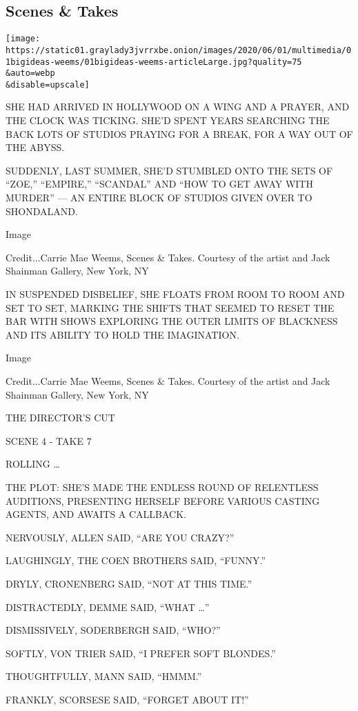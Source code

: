 \hypertarget{scenes--takes}{%
\subsection{Scenes \& Takes}\label{scenes--takes}}

\texttt{[image: https://static01.graylady3jvrrxbe.onion/images/2020/06/01/multimedia/01bigideas-weems/01bigideas-weems-articleLarge.jpg?quality=75\\\&auto=webp\\\&disable=upscale]}

SHE HAD ARRIVED IN HOLLYWOOD ON A WING AND A PRAYER, AND THE CLOCK WAS
TICKING. SHE'D SPENT YEARS SEARCHING THE BACK LOTS OF STUDIOS PRAYING
FOR A BREAK, FOR A WAY OUT OF THE ABYSS.

SUDDENLY, LAST SUMMER, SHE'D STUMBLED ONTO THE SETS OF ``ZOE,''
``EMPIRE,'' ``SCANDAL'' AND ``HOW TO GET AWAY WITH MURDER'' --- AN
ENTIRE BLOCK OF STUDIOS GIVEN OVER TO SHONDALAND.

Image

Credit...Carrie Mae Weems, Scenes \& Takes. Courtesy of the artist and
Jack Shainman Gallery, New York, NY

IN SUSPENDED DISBELIEF, SHE FLOATS FROM ROOM TO ROOM AND SET TO SET,
MARKING THE SHIFTS THAT SEEMED TO RESET THE BAR WITH SHOWS EXPLORING THE
OUTER LIMITS OF BLACKNESS AND ITS ABILITY TO HOLD THE IMAGINATION.

Image

Credit...Carrie Mae Weems, Scenes \& Takes. Courtesy of the artist and
Jack Shainman Gallery, New York, NY

THE DIRECTOR'S CUT

SCENE 4 - TAKE 7

ROLLING \ldots{}

THE PLOT: SHE'S MADE THE ENDLESS ROUND OF RELENTLESS AUDITIONS,
PRESENTING HERSELF BEFORE VARIOUS CASTING AGENTS, AND AWAITS A CALLBACK.

NERVOUSLY, ALLEN SAID, ``ARE YOU CRAZY?''

LAUGHINGLY, THE COEN BROTHERS SAID, ``FUNNY.''

DRYLY, CRONENBERG SAID, ``NOT AT THIS TIME.''

DISTRACTEDLY, DEMME SAID, ``WHAT \ldots{}''

DISMISSIVELY, SODERBERGH SAID, ``WHO?''

SOFTLY, VON TRIER SAID, ``I PREFER SOFT BLONDES.''

THOUGHTFULLY, MANN SAID, ``HMMM.''

FRANKLY, SCORSESE SAID, ``FORGET ABOUT IT!''

